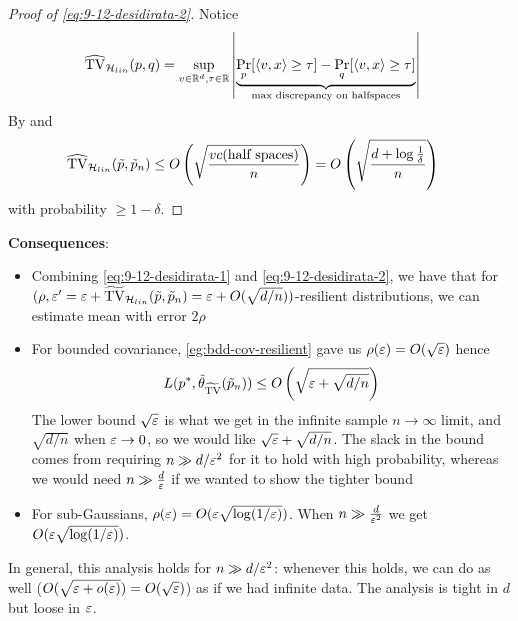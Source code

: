 \begin{proof}[Proof of \cref{eq:9-12-desidirata-2}]
    Notice
    \begin{align}
        \widehat{\operatorname{TV}}_{\mathcal{H}_{lin}}(p,q)
        &= \sup_{v \in \mathbb{R}^d, \tau \in \mathbb{R}} \left\lvert
            \underbrace{\Pr_p[\braket{v,x} \geq \tau] - \Pr_q[\braket{v,x} \geq \tau]}_{\text{max discrepancy on halfspaces}}
        \right\rvert
    \end{align}
    By  and 
    \begin{align}
        \widehat{\operatorname{TV}}_{\mathcal{H}_{lin}}(\tilde{p}, \tilde{p}_n)
        &\leq O\left(\sqrt{\frac{vc(\text{half spaces})}{n}}\right)
        = O\left(\sqrt{\frac{d + \log \frac{1}{\delta}}{n}}\right)
    \end{align}
    with probability $\geq 1 - \delta$.
\end{proof}

\textbf{Consequences}:
\begin{itemize}
    \item Combining \cref{eq:9-12-desidirata-1} and \cref{eq:9-12-desidirata-2}, we have
        that for
        $(\rho, \varepsilon' = \varepsilon + \widetilde{\operatorname{TV}}_{\mathcal{H}_{lin}}(\tilde{p}, \tilde{p}_n) = \varepsilon + O(\sqrt{d/n}))$-resilient distributions, we can estimate mean with error $2 \rho$
    \item For bounded covariance, \cref{eg:bdd-cov-resilient} gave us
        $\rho(\varepsilon) = O(\sqrt{\varepsilon})$ hence
    \begin{align}
        L(p^*, \tilde{\theta}_{\widetilde{\operatorname{TV}}}(\tilde{p}_n))
        \leq O\left(\sqrt{\varepsilon + \sqrt{d/n}}\right)
    \end{align}
    The lower bound $\sqrt{\varepsilon}$ is what we get in the infinite sample $n \to \infty$
    limit, and $\sqrt{d/n}$ when $\varepsilon \to 0$, so we would like $\sqrt{\varepsilon} + \sqrt{d/n}$.
    The slack in the bound comes from requiring $n \gg d / \varepsilon^2$ for it to hold with high probability,
    whereas we would need $n \gg \frac{d}{\varepsilon}$ if we wanted to show the tighter bound

    \item For sub-Gaussians, $\rho(\varepsilon) = O(\varepsilon \sqrt{\log(1/\varepsilon)})$.
        When $n \gg \frac{d}{\varepsilon^2}$ we get $O(\varepsilon \sqrt{\log (1/\varepsilon)})$.
\end{itemize}
In general, this analysis holds for $n \gg d / \varepsilon^2$: whenever this holds, we can
do as well ($O(\sqrt{\varepsilon + o(\varepsilon)}) = O(\sqrt{\varepsilon})$) as if we had infinite data.
The analysis is tight in $d$ but loose in $\varepsilon$.
